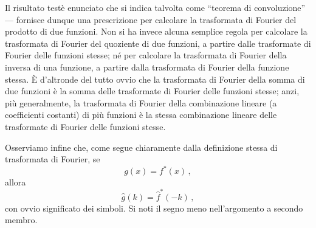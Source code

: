 \documentclass[11pt, a4paper]{book}
\numberwithin{equation}{section}
\begin{document}
Il risultato testè enunciato che si indica talvolta come ``teorema di convoluzione'' --- fornisce dunque una prescrizione per calcolare la trasformata di Fourier del prodotto di due funzioni. Non si ha invece alcuna semplice regola per calcolare la trasformata di Fourier del quoziente di due funzioni, a partire dalle trasformate di Fourier delle funzioni stesse; né per calcolare la trasformata di Fourier della inversa di una funzione, a partire dalla trasformata di Fourier della funzione stessa. È d'altronde del tutto ovvio che la trasformata di Fourier della somma di due funzioni è la somma delle trasformate di Fourier delle funzioni stesse; anzi, più generalmente, la trasformata di Fourier della combinazione lineare (a coefficienti costanti) di più funzioni è la stessa combinazione lineare delle trasformate di Fourier delle funzioni stesse.

Osserviamo infine che, come segue chiaramente dalla definizione stessa di trasformata di Fourier, se
\begin{equation}
  g(x) = f^*(x)\,, \tag{21}
\end{equation}
allora
\begin{equation}
  \hat{g}(k) = \hat{f}^*(-k)\,, \tag{22}
\end{equation}
con ovvio significato dei simboli. Si noti il segno meno nell'argomento a secondo membro.
\end{document}
